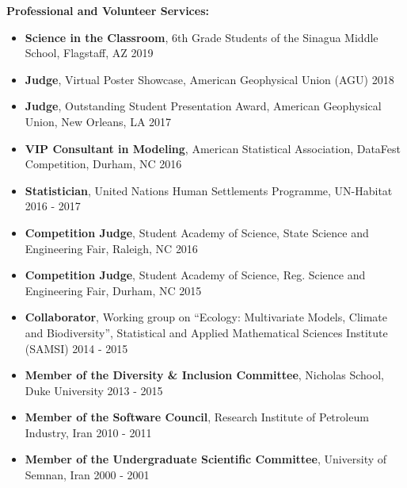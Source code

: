 \documentclass[10pt]{article}
\newenvironment{changemargin}[2]{%
  \begin{list}{}{%
 \setlength{\topsep}{0pt}%
 \setlength{\leftmargin}{#1}%
 \setlength{\rightmargin}{#2}%
 \setlength{\listparindent}{\parindent}%
 \setlength{\itemindent}{\parindent}%
 \setlength{\parsep}{\parskip}%
  }%
  \item[]}{\end{list}
}
\newenvironment{body} {
  \vspace*{-2pt}
  \begin{changemargin}{-0.5in}{-0.5in}
}
{\end{changemargin}
}
\begin{document}
\begin{body}
  \textbf{Professional and Volunteer Services:} \\
  \vspace*{-4pt}
  \begin{itemize} \itemsep -0pt
    \item[] \textbf{Science in the Classroom}, 6th Grade Students of the Sinagua Middle School, Flagstaff, AZ \hfill  {2019}\\
    \item[] \textbf{Judge}, Virtual Poster Showcase, American Geophysical Union (AGU) \hfill  {2018}\\
    \item[] \textbf{Judge}, Outstanding Student Presentation Award, American Geophysical Union, New Orleans, LA \hfill  {2017}\\
    \item[] \textbf{VIP Consultant in Modeling}, American Statistical Association, DataFest Competition, Durham, NC \hfill  {2016}\\
    \item[] \textbf{Statistician}, United Nations Human Settlements Programme, UN-Habitat \hfill  {2016 -  2017}\\
    \item[] \textbf{Competition Judge}, Student Academy of Science, State Science and Engineering Fair, Raleigh, NC \hfill  {2016}\\
    \item[] \textbf{Competition Judge}, Student Academy of Science, Reg. Science and Engineering Fair, Durham, NC \hfill  {2015}\\
    \item[] \textbf{Collaborator}, Working group on ``Ecology: Multivariate Models, Climate and Biodiversity'', Statistical and Applied Mathematical Sciences Institute (SAMSI) \hfill  {2014 - 2015}\\
    \item[] \textbf{Member of the Diversity \& Inclusion Committee}, Nicholas School, Duke University \hfill  {2013 -  2015}\\
    \item[] \textbf{Member of the Software Council}, Research Institute of Petroleum Industry, Iran \hfill  {2010 - 2011}\\
    \item[] \textbf{Member of the Undergraduate Scientific Committee}, University of Semnan, Iran \hfill  {2000 -  2001}\\
  \end{itemize}


\end{body}
\end{document}
